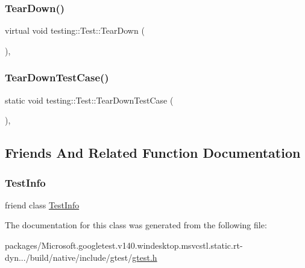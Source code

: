 \mbox{\label{classtesting_1_1_test_aab3c02c9f81afe1357adfc45afccd474}} 
\subsubsection{\texorpdfstring{TearDown()}{TearDown()}}
{\footnotesize\ttfamily virtual void testing\+::\+Test\+::\+Tear\+Down (\begin{DoxyParamCaption}{ }\end{DoxyParamCaption})\hspace{0.3cm}{\ttfamily [protected]}, {\ttfamily [virtual]}}

\mbox{\label{classtesting_1_1_test_af374706cbaf0ffc460f4fd04e7c150f1}} 
\subsubsection{\texorpdfstring{TearDownTestCase()}{TearDownTestCase()}}
{\footnotesize\ttfamily static void testing\+::\+Test\+::\+Tear\+Down\+Test\+Case (\begin{DoxyParamCaption}{ }\end{DoxyParamCaption})\hspace{0.3cm}{\ttfamily [inline]}, {\ttfamily [static]}}



\subsection{Friends And Related Function Documentation}
\mbox{\label{classtesting_1_1_test_a4c49c2cdb6c328e6b709b4542f23de3c}} 
\subsubsection{\texorpdfstring{TestInfo}{TestInfo}}
{\footnotesize\ttfamily friend class \mbox{\hyperlink{classtesting_1_1_test_info}{Test\+Info}}\hspace{0.3cm}{\ttfamily [friend]}}



The documentation for this class was generated from the following file\+:\begin{DoxyCompactItemize}
\item 
packages/\+Microsoft.\+googletest.\+v140.\+windesktop.\+msvcstl.\+static.\+rt-\/dyn.../build/native/include/gtest/\mbox{\hyperlink{gtest_8h}{gtest.\+h}}\end{DoxyCompactItemize}
